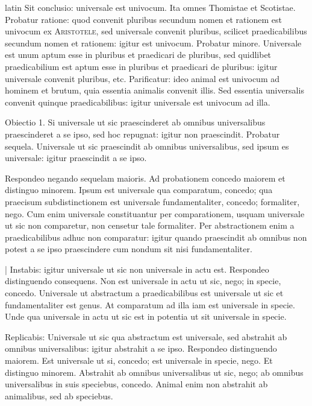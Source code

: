 \begin{otherlanguage*}{latin}
\pstart
Sit conclusio:
universale est univocum. Ita omnes Thomistae et Scotistae. Probatur ratione:
quod convenit pluribus secundum nomen et rationem est univocum ex \textsc{Aristotele}, sed universale convenit pluribus, scilicet praedicabilibus secundum nomen et rationem:
igitur est univocum. Probatur minore. Universale est unum aptum esse in pluribus et praedicari de pluribus, sed quidlibet praedicabilium est aptum esse in pluribus et praedicari de pluribus:
igitur universale convenit pluribus, etc. Parificatur:
ideo animal est univocum ad hominem et brutum, quia essentia animalis convenit illis. Sed essentia universalis convenit quinque praedicabilibus:
igitur universale est univocum ad illa. 
\pend

\pstart
Obiectio 1. Si universale ut sic praescinderet ab omnibus universalibus praescinderet a se ipso, sed hoc repugnat:
igitur non praescindit. Probatur sequela. Universale ut sic praescindit ab omnibus universalibus, sed ipsum es universale:
igitur praescindit a se ipso. 
\pend

\pstart
Respondeo negando sequelam maioris. Ad probationem concedo maiorem et distinguo minorem. Ipsum est universale qua comparatum, concedo; qua praecisum subdistinctionem est universale fundamentaliter, concedo; formaliter, nego. Cum enim universale constituantur per comparationem, usquam universale ut sic non comparetur, non censetur tale formaliter. Per abstractionem enim a praedicabilibus adhuc non comparatur:
igitur quando praescindit ab omnibus non potest a se ipso praescindere cum nondum sit nisi fundamentaliter. 
\pend

\pstart
\textnormal{|} Instabis:
igitur universale ut sic non universale in actu est. Respondeo distinguendo consequens. Non est universale in actu ut sic, nego; in specie, concedo. Universale ut abstractum a praedicabilibus est universale ut sic et fundamentaliter est genus. At comparatum ad illa iam est universale in specie. Unde qua universale in actu ut sic est in potentia ut sit universale in specie. 
\pend

\pstart
Replicabis:
Universale ut sic qua abstractum est universale, sed abstrahit ab omnibus universalibus:
igitur abstrahit a se ipso. Respondeo distinguendo maiorem. Est universale ut si, concedo; est universale in specie, nego. Et distinguo minorem. Abstrahit ab omnibus universalibus ut sic, nego; ab omnibus universalibus in suis speciebus, concedo. Animal enim non abstrahit ab animalibus, sed ab speciebus. 
\pend


\end{otherlanguage*}

